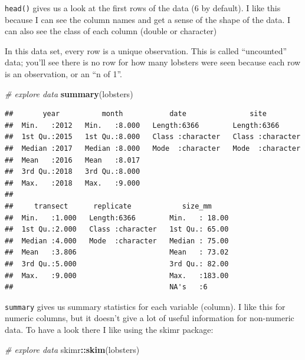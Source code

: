\documentclass[]{book}
\newenvironment{Shaded}{\begin{snugshade}}{\end{snugshade}}
\newcommand{\CommentTok}[1]{\textcolor[rgb]{0.56,0.35,0.01}{\textit{#1}}}
\newcommand{\KeywordTok}[1]{\textcolor[rgb]{0.13,0.29,0.53}{\textbf{#1}}}
\newcommand{\NormalTok}[1]{#1}
\newcommand{\OperatorTok}[1]{\textcolor[rgb]{0.81,0.36,0.00}{\textbf{#1}}}
\begin{document}
\texttt{head()} gives us a look at the first rows of the data (6 by default). I like this because I can see the column names and get a sense of the shape of the data. I can also see the class of each column (double or character)

In this data set, every row is a unique observation. This is called ``uncounted'' data; you'll see there is no row for how many lobsters were seen because each row is an observation, or an ``n of 1''.

\begin{Shaded}
\begin{Highlighting}[]
\CommentTok{# explore data}
\KeywordTok{summary}\NormalTok{(lobsters) }
\end{Highlighting}
\end{Shaded}

\begin{verbatim}
##       year          month           date               site          
##  Min.   :2012   Min.   :8.000   Length:6366        Length:6366       
##  1st Qu.:2015   1st Qu.:8.000   Class :character   Class :character  
##  Median :2017   Median :8.000   Mode  :character   Mode  :character  
##  Mean   :2016   Mean   :8.017                                        
##  3rd Qu.:2018   3rd Qu.:8.000                                        
##  Max.   :2018   Max.   :9.000                                        
##                                                                      
##     transect      replicate            size_mm      
##  Min.   :1.000   Length:6366        Min.   : 18.00  
##  1st Qu.:2.000   Class :character   1st Qu.: 65.00  
##  Median :4.000   Mode  :character   Median : 75.00  
##  Mean   :3.806                      Mean   : 73.02  
##  3rd Qu.:5.000                      3rd Qu.: 82.00  
##  Max.   :9.000                      Max.   :183.00  
##                                     NA's   :6
\end{verbatim}

\texttt{summary} gives us summary statistics for each variable (column). I like this for numeric columns, but it doesn't give a lot of useful information for non-numeric data. To have a look there I like using the skimr package:

\begin{Shaded}
\begin{Highlighting}[]
\CommentTok{# explore data}
\NormalTok{skimr}\OperatorTok{::}\KeywordTok{skim}\NormalTok{(lobsters) }
\end{Highlighting}
\end{Shaded}
\end{document}
